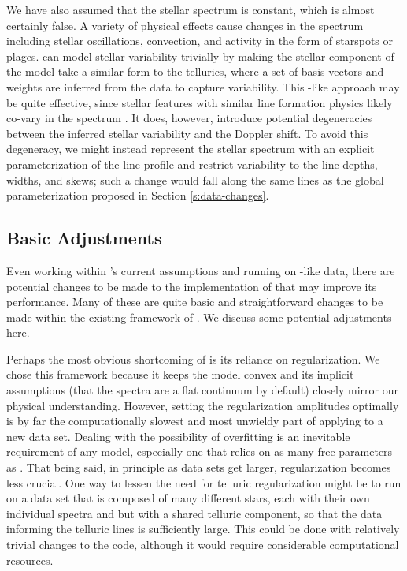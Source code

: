 \documentclass[twocolumn]{aastex62}
\begin{document}
We have also assumed that the stellar spectrum is constant, which is almost certainly false. 
A variety of physical effects cause changes in the spectrum including stellar oscillations, convection, and activity in the form of starspots or plages. 
\wobble can model stellar variability trivially by making the stellar component of the model take a similar form to the tellurics, where a set of basis vectors and weights are inferred from the data to capture variability. 
This \PCA-like approach may be quite effective, since stellar features with similar line formation physics likely co-vary in the spectrum \citep{Davis2017, Dumusque2018}. 
It does, however, introduce potential degeneracies between the inferred stellar variability and the Doppler shift. 
To avoid this degeneracy, we might instead represent the stellar spectrum with an explicit parameterization of the line profile and restrict variability to the line depths, widths, and skews; such a change would fall along the same lines as the global \LSF parameterization proposed in Section \ref{s:data-changes}.

\subsection{Basic Adjustments}
\label{s:improvements}

Even working within \wobble's current assumptions and running on \HARPS-like data, there are potential changes to be made to the implementation of \wobble that may improve its performance. 
Many of these are quite basic and straightforward changes to be made within the existing framework of \wobble. 
We discuss some potential adjustments here.

Perhaps the most obvious shortcoming of \wobble is its reliance on regularization. 
We chose this framework because it keeps the model convex and its implicit assumptions (that the spectra are a flat continuum by default) closely mirror our physical understanding. 
However, setting the regularization amplitudes optimally is by far the computationally slowest and most unwieldy part of applying \wobble to a new data set. 
Dealing with the possibility of overfitting is an inevitable requirement of any model, especially one that relies on as many free parameters as \wobble. 
That being said, in principle as data sets get larger, regularization becomes less crucial. 
One way to lessen the need for telluric regularization might be to run on a data set that is composed of many different stars, each with their own individual spectra and \RVs but with a shared telluric component, so that the data informing the telluric lines is sufficiently large. 
This could be done with relatively trivial changes to the \wobble code, although it would require considerable computational resources.
\end{document}
